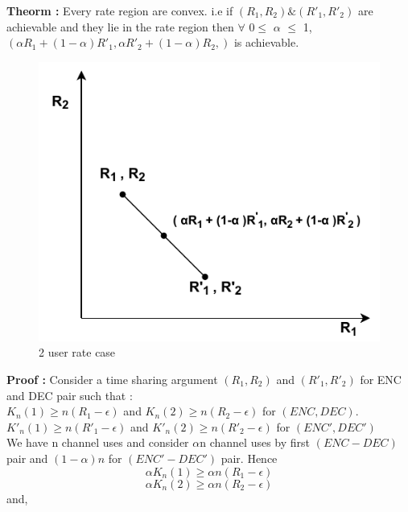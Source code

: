 \documentclass{article}
\begin{document}
\newline 
\textbf{Theorm :} Every rate region are convex. i.e if   $\left( R_{1}, R_{2}\right) \& \left( R'_{1}, R'_{2}\right)$ are achievable and they lie in the rate region then $\forall$ 0$\leq$ $\alpha$ $\leq$ 1, \hspace{5pt} $\left( \alpha R_{1} + (1-\alpha)R'_{1}, \alpha R'_{2} + (1-\alpha)R_{2},   \right)$ is achievable.\\
  \begin{figure}[htb!]
	\centering
	\includegraphics[height=.25\textheight]{pic5.pdf}
	\caption{2 user rate  case}
\end{figure}
\textbf{Proof :}  Consider a time sharing argument $\left(R_1, R_2 \right)$ and  $\left(R'_1, R'_2 \right)$ for ENC and DEC pair such that :\\
 $K_{n}(1) \geq n\left( R_1 - \epsilon \right)$ and $K_{n}(2) \geq n\left( R_2 - \epsilon \right)$ for $\left( ENC, DEC \right)$.
  $K'_{n}(1) \geq n\left( R'_1 - \epsilon \right)$ and $K'_{n}(2) \geq n\left( R'_2 - \epsilon \right)$ for $\left( ENC', DEC' \right)$ \\
  We have n channel uses and consider $\alpha$n  channel uses by first  $\left( ENC-DEC \right)$ pair and $\left(1 -\alpha \right)n$ for  $\left( ENC'-DEC' \right)$ pair. Hence
  \begin{equation}
  	  \alpha K_{n}(1) \geq \alpha n\left( R_1 - \epsilon \right) \label{2.5}
  	\end{equation}
    \begin{equation}
\alpha K_{n}(2) \geq   \alpha n\left( R_2 - \epsilon \right) \label{2.6}
  \end{equation}
 and,
  
\end{document}

